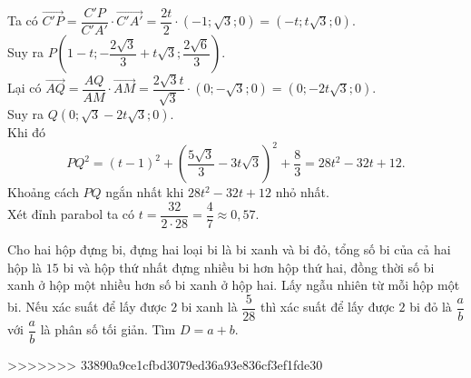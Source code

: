 \begin{ex}
{{\begin{tikzpicture}[scale=0.8,>=stealth, line join=round, line cap=round, font=\footnotesize]
\end{tikzpicture}		
		}\noindent
Ta có $\overrightarrow{C'P}=\dfrac{C'P}{C'A'}\cdot\overrightarrow{C'A'}=\dfrac{2t}{2}\cdot \left(-1;\sqrt{3};0\right)=\left(-t;t\sqrt{3};0\right)$.\\
Suy ra $P\left(1-t;-\dfrac{2\sqrt{3}}{3}+t\sqrt{3};\dfrac{2\sqrt{6}}{3}\right)$.\\
		Lại có $\overrightarrow{AQ}=\dfrac{AQ}{AM}\cdot \overrightarrow{AM} = \dfrac{2\sqrt{3}t}{\sqrt{3}}\cdot \left(0;-\sqrt{3};0\right) = \left(0;-2t\sqrt{3};0\right)$.\\
		Suy ra $Q\left(0;\sqrt{3}-2t\sqrt{3};0\right)$.\\
		Khi đó
		$$
			PQ^2 = (t-1)^2 + \left(\dfrac{5\sqrt{3}}{3}-3t\sqrt{3}\right)^2 + \dfrac{8}{3}
			= 28t^2-32t+12.
		$$
		Khoảng cách $PQ$ ngắn nhất khi $28t^2-32t+12$ nhỏ nhất.\\ Xét đỉnh parabol ta có $t=\dfrac{32}{2\cdot 28} = \dfrac{4}{7} \approx 0{,}57$.
	}
\end{ex}

\begin{ex}%
Cho hai hộp đựng bi, đựng hai loại bi là bi xanh và bi đỏ, tổng số bi của cả hai hộp là $15$ bi và hộp thứ nhất đựng nhiều bi hơn hộp thứ hai, đồng thời số bi xanh ở hộp một nhiều hơn số bi xanh ở hộp hai. Lấy ngẫu nhiên từ mỗi hộp một bi. Nếu xác suất để lấy được $2$ bi xanh là $\dfrac{5}{28}$ thì xác suất để lấy được $2$ bi đỏ là $\dfrac{a}{b}$ với $\dfrac{a}{b}$ là phân số tối giản. Tìm $D=a+b$.
	\par{}
\end{ex}

>>>>>>> 33890a9ce1cfbd3079ed36a93e836cf3ef1fde30
